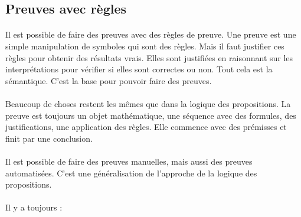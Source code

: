 
\subsection{Preuves avec règles}

\paragraph{}
    Il est possible de faire des preuves avec des règles de preuve. Une preuve est une simple manipulation de symboles qui sont des règles. Mais il faut justifier ces règles pour obtenir des résultats vrais. Elles sont justifiées en raisonnant sur les interprétations pour vérifier si elles sont correctes ou non. Tout cela est la sémantique. C'est la base pour pouvoir faire des preuves.
 \paragraph{}
    
Beaucoup de choses restent les mêmes que dans la logique des propositions. La preuve est toujours un objet mathématique, une séquence avec des formules, des justifications, une application des règles. Elle commence avec des prémisses et finit par une conclusion.

\paragraph{}
Il est possible de faire des preuves manuelles, mais aussi des preuves automatisées. C'est une généralisation de l'approche de la logique des propositions. 
\paragraph{}

Il y a toujours :

